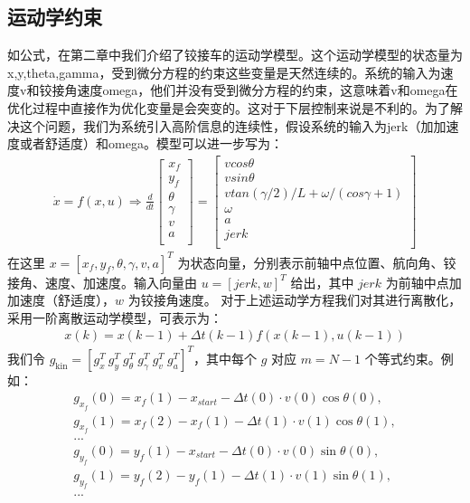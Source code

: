 \documentclass[master,academic]{ysuthesis} %
\begin{document}
		\subsection{运动学约束}
		如公式，在第二章中我们介绍了铰接车的运动学模型。这个运动学模型的状态量为x,y,theta,gamma，受到微分方程的约束这些变量是天然连续的。系统的输入为速度v和铰接角速度omega，他们并没有受到微分方程的约束，这意味着v和omega在优化过程中直接作为优化变量是会突变的。这对于下层控制来说是不利的。为了解决这个问题，我们为系统引入高阶信息的连续性，假设系统的输入为jerk（加加速度或者舒适度）和omega。模型可以进一步写为：
		\begin{equation}
			\begin{aligned}
				\dot{x}=f( x,u ) \Longrightarrow \frac{d}{dt}\left[ \begin{array}{c}
					x_f\\
					y_f\\
					\theta\\
					\gamma\\
					v\\
					a\\
				\end{array} \right] =\left[ \begin{array}{c}
					vcos\theta\\
					vsin\theta\\
					vtan( \gamma /2 ) /L+\omega / (cos\gamma +1 )\\
					\omega\\
					a\\
					jerk\\
				\end{array} \right] 
			\end{aligned}   
		\end{equation}
		在这里 $x=\left[ x_f,y_f,\theta,\gamma,v,a \right]^T$ 为状态向量，分别表示前轴中点位置、航向角、铰接角、速度、加速度。输入向量由 $u=\left[jerk,w\right]^T$ 给出，其中 $jerk$ 为前轴中点加加速度（舒适度），$w$ 为铰接角速度。
		对于上述运动学方程我们对其进行离散化，采用一阶离散运动学模型，可表示为：
		\begin{equation}
			\begin{aligned}
				x( k ) =x( k-1 ) +\Delta t( k-1 ) f( x( k-1 ) ,u( k-1 ) ) 
			\end{aligned}   
		\end{equation}
		我们令 \(g_{\text{kin}} = [g_x^T\ g_y^T\ g_\theta^T\ g_\gamma^T\ g_v^T\ g_a^T]^T\)，其中每个 \(g\) 对应 \(m = N-1\) 个等式约束。例如：
		\begin{equation}
			\begin{aligned}
				g_{x_f}( 0 ) =x_f( 1 ) -x_{start}-\Delta t( 0 ) \cdot v( 0 ) \cos \theta( 0 ) ,\\
				g_{x_f}( 1 ) =x_f( 2 ) -x_f( 1 ) -\Delta t( 1 ) \cdot v( 1 ) \cos \theta ( 1 ) ,\\
				...\\
				g_{y_f}( 0 ) =y_f( 1 ) -x_{start}-\Delta t( 0 ) \cdot v( 0 ) \sin \theta ( 0 ) ,\\
				g_{y_f}( 1 ) =y_f( 2 ) -y_f( 1 ) -\Delta t( 1 ) \cdot v( 1 ) \sin \theta ( 1 ) ,\\
				...
			\end{aligned}   
		\end{equation}
\end{document}
